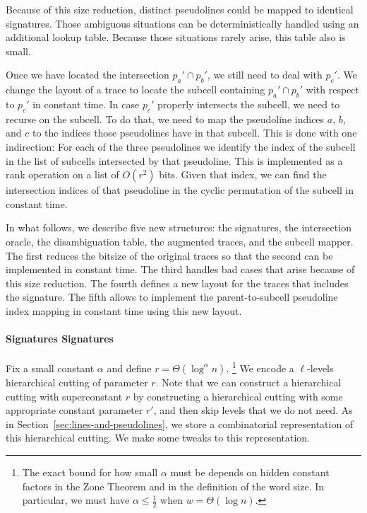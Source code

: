 Because of this size reduction, distinct pseudolines could
be mapped to identical signatures.
%
Those ambiguous situations can be deterministically handled using
an additional lookup table.
%
Because those situations rarely arise, this table also is small.

Once we have located the intersection \(p_a' \cap p_b'\), we still need to deal
with \(p_c'\). We change the layout of a trace to locate the subcell containing
\(p_a' \cap p_b'\) with respect to \(p_c'\) in constant time.
%
In case \(p_c'\) properly intersects the subcell, we need to recurse on the
subcell. To do that, we need to map the pseudoline indices \(a\), \(b\), and
\(c\) to the indices those pseudolines have in that subcell. This is
done with one indirection:
%
For each of the three pseudolines we
identify the index of the subcell in the list of subcells intersected by that
pseudoline.
This is implemented as a rank operation on a list of \(O(r^2)\) bits.
%
Given that index, we can find the intersection indices of that pseudoline in
the cyclic permutation of the subcell in constant time.

In what follows, we describe five new structures:
the signatures,
the intersection oracle,
the disambiguation table,
the augmented traces,
and the subcell mapper.
%
The first reduces the bitsize of the original traces so that the second can
be implemented in constant time. The third handles bad cases that arise because
of this size reduction. The fourth defines a new layout for the traces that
includes the signature. The fifth allows to implement the parent-to-subcell
pseudoline index mapping in constant time using this new layout.
%
\paragraph*{\iftitlecase%
Signatures\else%
Signatures\fi}
Fix a small constant \(\alpha\) and define \(r = \Theta(\log^{\alpha} n)\).%
\footnote{%
  The exact bound for how small \(\alpha\)
  must be depends on hidden constant factors in the Zone Theorem and in the definition
  of the word size. In particular, we must have \(\alpha \leq \frac 12\) when
  \(w = \Theta(\log n)\).%
}
%
We encode a \(\ell\)-levels hierarchical cutting of parameter \(r\).
%
Note that we can construct a hierarchical cutting with
superconstant \(r\) by constructing a hierarchical cutting with some
appropriate constant parameter \(r'\), and then skip levels that we do not
need.
%
As in Section~\ref{sec:lines-and-pseudolines}, we store a combinatorial representation of
this hierarchical cutting. We make some tweaks to this representation.

